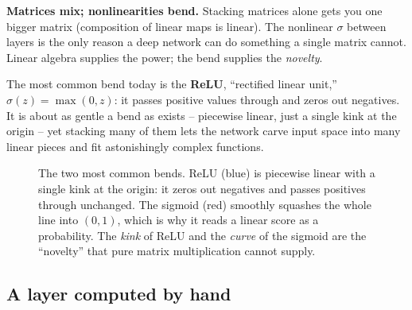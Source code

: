 \begin{focusbox}
\textbf{Matrices mix; nonlinearities bend.} Stacking matrices alone gets you one bigger
matrix (composition of linear maps is linear). The nonlinear $\sigma$ between layers is
the only reason a deep network can do something a single matrix cannot. Linear algebra
supplies the power; the bend supplies the \emph{novelty}.
\end{focusbox}

The most common bend today is the \textbf{ReLU}, ``rectified linear unit,''
$\sigma(z)=\max(0,z)$: it passes positive values through and zeros out negatives. It is
about as gentle a bend as exists -- piecewise linear, just a single kink at the origin --
yet stacking many of them lets the network carve input space into many linear pieces and
fit astonishingly complex functions.

\begin{figure}[H]
\centering
{}
\caption{The two most common bends. ReLU (blue) is piecewise linear with a single kink at
the origin: it zeros out negatives and passes positives through unchanged. The sigmoid
(red) smoothly squashes the whole line into $(0,1)$, which is why it reads a linear score
as a probability. The \emph{kink} of ReLU and the \emph{curve} of the sigmoid are the
``novelty'' that pure matrix multiplication cannot supply.}
\label{ch34:fig-activations}
\end{figure}

\subsection{A layer computed by hand}

